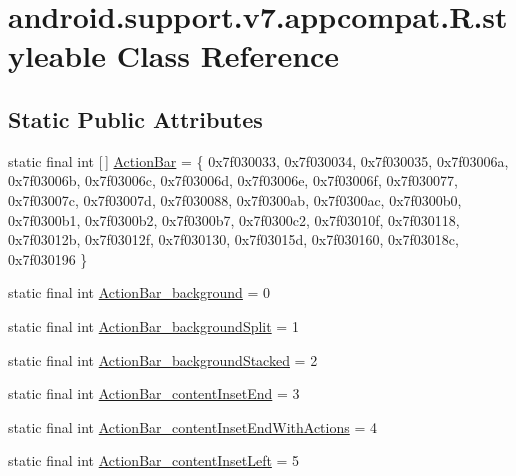 \hypertarget{classandroid_1_1support_1_1v7_1_1appcompat_1_1_r_1_1styleable}{}\section{android.\+support.\+v7.\+appcompat.\+R.\+styleable Class Reference}
\label{classandroid_1_1support_1_1v7_1_1appcompat_1_1_r_1_1styleable}
\subsection*{Static Public Attributes}
\begin{DoxyCompactItemize}
\item 
static final int \mbox{[}$\,$\mbox{]} \mbox{\hyperlink{classandroid_1_1support_1_1v7_1_1appcompat_1_1_r_1_1styleable_a5941dc15714398e9ec9afaa0155cc1cf}{Action\+Bar}} = \{ 0x7f030033, 0x7f030034, 0x7f030035, 0x7f03006a, 0x7f03006b, 0x7f03006c, 0x7f03006d, 0x7f03006e, 0x7f03006f, 0x7f030077, 0x7f03007c, 0x7f03007d, 0x7f030088, 0x7f0300ab, 0x7f0300ac, 0x7f0300b0, 0x7f0300b1, 0x7f0300b2, 0x7f0300b7, 0x7f0300c2, 0x7f03010f, 0x7f030118, 0x7f03012b, 0x7f03012f, 0x7f030130, 0x7f03015d, 0x7f030160, 0x7f03018c, 0x7f030196 \}
\item 
static final int \mbox{\hyperlink{classandroid_1_1support_1_1v7_1_1appcompat_1_1_r_1_1styleable_a9b51f8b4bd472a2d03b0839a309d3701}{Action\+Bar\+\_\+background}} = 0
\item 
static final int \mbox{\hyperlink{classandroid_1_1support_1_1v7_1_1appcompat_1_1_r_1_1styleable_ab082a8a80c786208f65d64a76e5a6fe2}{Action\+Bar\+\_\+background\+Split}} = 1
\item 
static final int \mbox{\hyperlink{classandroid_1_1support_1_1v7_1_1appcompat_1_1_r_1_1styleable_a35f9b7c13f145fbf00832637f16b0a28}{Action\+Bar\+\_\+background\+Stacked}} = 2
\item 
static final int \mbox{\hyperlink{classandroid_1_1support_1_1v7_1_1appcompat_1_1_r_1_1styleable_ae23884da67e331c52fd10fe8cd2fcf68}{Action\+Bar\+\_\+content\+Inset\+End}} = 3
\item 
static final int \mbox{\hyperlink{classandroid_1_1support_1_1v7_1_1appcompat_1_1_r_1_1styleable_a72dba036e2ecbaa6aed56d26793dd2ca}{Action\+Bar\+\_\+content\+Inset\+End\+With\+Actions}} = 4
\item 
static final int \mbox{\hyperlink{classandroid_1_1support_1_1v7_1_1appcompat_1_1_r_1_1styleable_aab3f14d5994d10e0983e7554cde05482}{Action\+Bar\+\_\+content\+Inset\+Left}} = 5

\end{DoxyCompactItemize}

